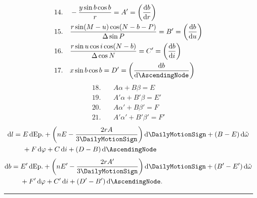 \[
\begin{aligned}
14.\quad&-\frac{y\sin b\cos b}{r}=A'=\left(\frac{\mathrm{d}b}{\mathrm{d}r}\right)\\
15.\quad&\frac{r\sin(M-u)\cos(N-b-P)}{\Delta\sin P}=B'=\left(\frac{\mathrm{d}b}{\mathrm{d}u}\right)\\
16.\quad&\frac{r\sin u\cos i\cos(N-b)}{\Delta\cos N}=C'=\left(\frac{\mathrm{d}b}{\mathrm{d}i}\right)\\
17.\quad&x\sin b\cos b=D'=\left(\frac{\mathrm{d}b}{\mathrm{d}\AscendingNode}\right)
\end{aligned}
\]
\[
\begin{aligned}
18.\quad&A\alpha+B\beta=E\\
19.\quad&A'\alpha+B'\beta=E'\\
20.\quad&A\alpha'+B\beta'=F\\
21.\quad&A'\alpha'+B'\beta'=F'
\end{aligned}
\]
\[
\begin{aligned}
\mathrm{d}l={}&E\,\mathrm{d}\mathrm{Ep.}+\left(nE-\frac{2rA}{3\DailyMotionSign}\right)\mathrm{d}\DailyMotionSign+(B-E)\,\mathrm{d}\tilde\omega\\
&+F\,\mathrm{d}\varphi+C\,\mathrm{d}i+(D-B)\,\mathrm{d}\AscendingNode
\end{aligned}
\]
\[
\begin{aligned}
\mathrm{d}b={}&E'\,\mathrm{d}\mathrm{Ep.}+\left(nE'-\frac{2rA'}{3\DailyMotionSign}\right)\mathrm{d}\DailyMotionSign+(B'-E')\,\mathrm{d}\tilde\omega\\
&+F'\,\mathrm{d}\varphi+C'\,\mathrm{d}i+(D'-B')\,\mathrm{d}\AscendingNode.
\end{aligned}
\]
\begin{center}\rule{.18\textwidth}{.35pt}\end{center}
